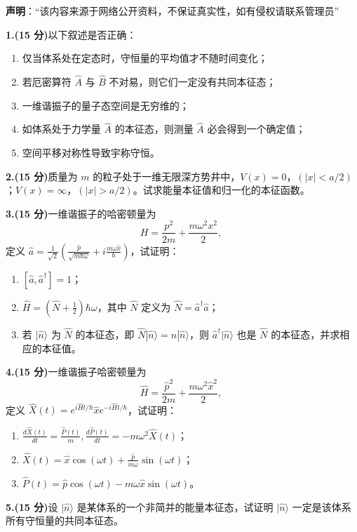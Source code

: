
\textbf{声明}：“该内容来源于网络公开资料，不保证真实性，如有侵权请联系管理员”

\textbf{1.(15 分)}以下叙述是否正确：

\begin{enumerate}
    \item  仅当体系处在定态时，守恒量的平均值才不随时间变化；
    \item  若厄密算符 $\hat{A}$ 与 $\hat{B}$ 不对易，则它们一定没有共同本征态；
    \item  一维谐振子的量子态空间是无穷维的；
    \item  如体系处于力学量 $\hat{A}$ 的本征态，则测量 $\hat{A}$ 必会得到一个确定值；
    \item  空间平移对称性导致宇称守恒。
\end{enumerate}

\textbf{2.(15 分)}质量为 $m$ 的粒子处于一维无限深方势井中，$V(x) = 0$，$(|x| < a/2)$；$V(x) = \infty$，$(|x| > a/2)$。试求能量本征值和归一化的本征函数。

\textbf{3.(15 分)}一维谐振子的哈密顿量为 
$$H = \frac{p^2}{2m} + \frac{m\omega^2 x^2}{2},~$$ 
定义 $\hat{a} = \frac{1}{\sqrt{2}} \left( \frac{\hat{p}}{\sqrt{m\hbar \omega}} + i\frac{m\omega \hat{x}}{\hbar} \right)$，试证明：
\begin{enumerate}
    \item  $[\hat{a}, \hat{a}^\dagger] = 1$；
    \item  $\hat{H} = (\hat{N} + \frac{1}{2})\hbar \omega$，其中 $\hat{N}$ 定义为 $\hat{N} = \hat{a}^\dagger \hat{a}$；
    \item  若 $|\hat{n}\rangle$ 为 $\hat{N}$ 的本征态，即 $\hat{N}|\hat{n}\rangle = n|\hat{n}\rangle$，则 $\hat{a}^\dagger|\hat{n}\rangle$ 也是 $\hat{N}$ 的本征态，并求相应的本征值。
\end{enumerate}

\textbf{4.(15 分)}一维谐振子哈密顿量为 
$$\hat{H} = \frac{\hat{p}^2}{2m} + \frac{m\omega^2 \hat{x}^2}{2},~$$ 
定义 $\hat{X}(t) = e^{i\hat{H}t/\hbar} \hat{x} e^{-i\hat{H}t/\hbar}$，试证明：
\begin{enumerate}
    \item  $\frac{d\hat{X}(t)}{dt} = \frac{\hat{P}(t)}{m}, \frac{d\hat{P}(t)}{dt} = -m\omega^2 \hat{X}(t)$；
    \item  $\hat{X}(t) = \hat{x} \cos(\omega t) + \frac{\hat{p}}{m\omega} \sin(\omega t)$；
    \item  $\hat{P}(t) = \hat{p} \cos(\omega t) - m\omega \hat{x} \sin(\omega t)$。
\end{enumerate}

\textbf{5.(15 分)}设 $|\hat{n}\rangle$ 是某体系的一个非简并的能量本征态，试证明 $|\hat{n}\rangle$ 一定是该体系所有守恒量的共同本征态。